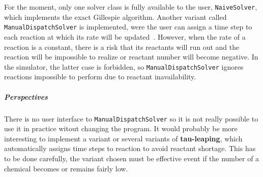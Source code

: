 For the moment, only one solver class is fully available to the user, \texttt{NaiveSolver}, which implements the exact Gillespie algorithm. Another variant called \texttt{ManualDispatchSolver} is implemented, were the user can assign a time step to each reaction at which its rate will be updated~. However, when the rate of a reaction is a constant, there is a risk that its reactants will run out and the reaction will be impossible to realize or reactant number will become negative. In the simulator, the latter case is forbidden, so \texttt{ManualDispatchSolver} ignores reactions impossible to perform due to reactant inavailability. 

\subparagraph{Perspectives} There is no user interface to \texttt{ManualDispatchSolver} so it is not really possible to use it in practice witout changing the program. It would probably be more interesting to implement a variant or several variants of \textbf{tau-leaping}, which automatically assigns time steps to reaction to avoid reactant shortage. This has to be done carefully, the variant chosen must be effective event if the number of a chemical becomes or remains fairly low.

